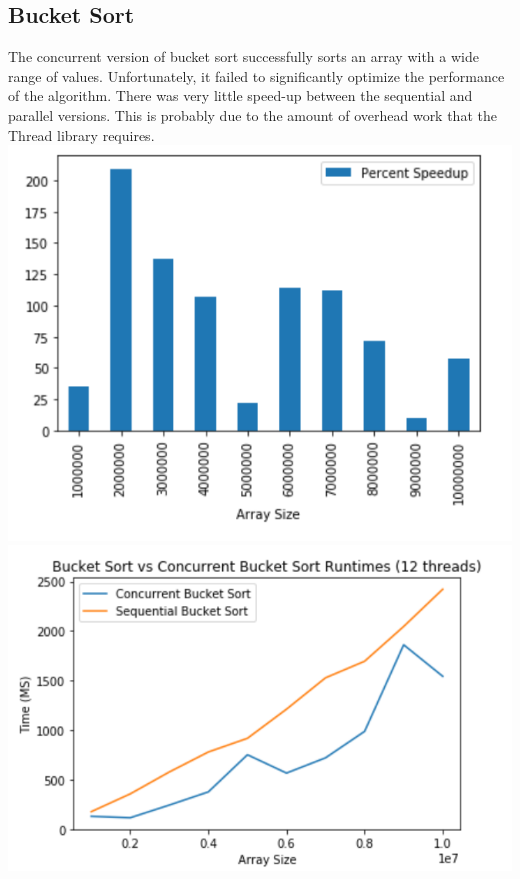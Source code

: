 \documentclass{article}
\begin{document}
\subsection{Bucket Sort}
The concurrent version of bucket sort successfully sorts an array with a wide range of values. Unfortunately, it failed to significantly optimize the performance of the algorithm. There was very little speed-up between the sequential and parallel versions. This is probably due to the amount of overhead work that the Thread library requires.\newline
\includegraphics{figures/bucketbar.PNG}\newline
\includegraphics{figures/bucketline.PNG}
\end{document}
